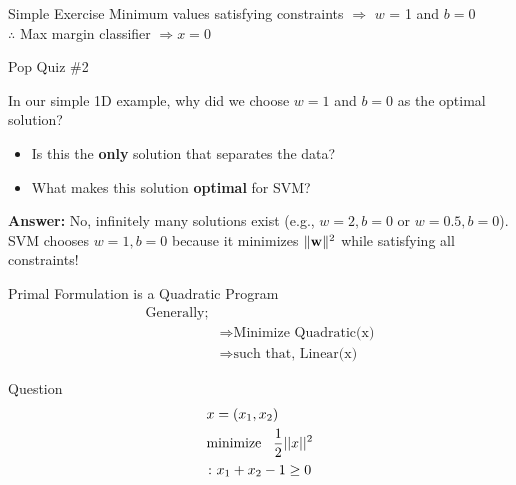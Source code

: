 \documentclass{beamer}
\begin{document}
\begin{frame}{Simple Exercise}
Minimum values satisfying constraints  $\Rightarrow$
$w$ = 1 and $b = 0$\\
$\therefore$ Max margin classifier $ \Rightarrow x = 0$

\end{frame}

\begin{frame}{Pop Quiz \#2}
\begin{tcolorbox}[colback=blue!5!white,colframe=blue!75!black,title=Think About This!]
In our simple 1D example, why did we choose $w = 1$ and $b = 0$ as the optimal solution?

\pause
\begin{itemize}
	\item Is this the \textbf{only} solution that separates the data?
	\item What makes this solution \textbf{optimal} for SVM?
\end{itemize}

\pause
\textbf{Answer:} No, infinitely many solutions exist (e.g., $w = 2, b = 0$ or $w = 0.5, b = 0$). \\
SVM chooses $w = 1, b = 0$ because it minimizes $\|\mathbf{w}\|^2$ while satisfying all constraints!
\end{tcolorbox}
\end{frame}

\begin{frame}{Primal Formulation is a Quadratic Program}
\begin{align*}
\text{Generally;}&\\
&\Rightarrow \text{Minimize Quadratic(x)}\\
&\Rightarrow \text{such that, Linear(x)}
\end{align*}
\begin{tcolorbox}
Question
\begin{align*}
&{x} = (x_{1}, x_{2})\\
&\text{minimize} \hspace{3mm} \frac{1}{2}||x||^{2}\\
&\colon x_{1} + x_{2} - 1 \geq 0
\end{align*}
\end{tcolorbox}
\end{frame}



{
	
}
\end{document}
